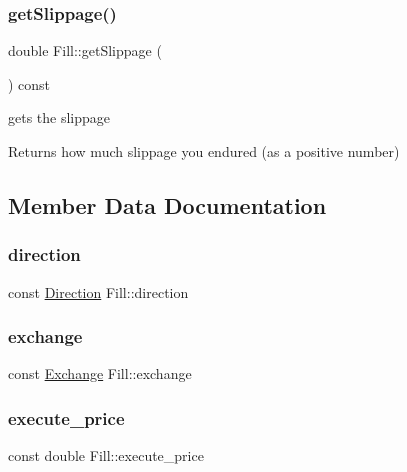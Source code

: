 \subsubsection{\texorpdfstring{get\+Slippage()}{getSlippage()}}
{\footnotesize\ttfamily double Fill\+::get\+Slippage (\begin{DoxyParamCaption}{ }\end{DoxyParamCaption}) const}



gets the slippage 

\begin{DoxyReturn}{Returns}
how much slippage you endured (as a positive number) 
\end{DoxyReturn}


\subsection{Member Data Documentation}
\mbox{\label{classFill_ab2451992abc07d5a0a217225bea39d3b}} 
\subsubsection{\texorpdfstring{direction}{direction}}
{\footnotesize\ttfamily const \hyperlink{fill_8h_a224b9163917ac32fc95a60d8c1eec3aa}{Direction} Fill\+::direction}

\mbox{\label{classFill_affe8391a70b7231659a2c54d38c449ee}} 
\subsubsection{\texorpdfstring{exchange}{exchange}}
{\footnotesize\ttfamily const \hyperlink{fill_8h_a0735734beae0a6b094ce815e727eeca0}{Exchange} Fill\+::exchange}

\mbox{\label{classFill_aee5774c287161b4b453d688fd75d24af}} 
\subsubsection{\texorpdfstring{execute\+\_\+price}{execute\_price}}
{\footnotesize\ttfamily const double Fill\+::execute\+\_\+price}

